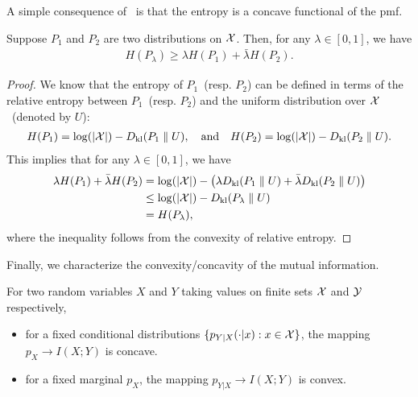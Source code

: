             A simple consequence of~ is that the entropy is a concave functional of the pmf. 
            \begin{corollary}
                \label{corollary:concavity-entropy} 
                Suppose $P_1$ and $P_2$ are two distributions on $\mathcal{X}$. Then, for any $\lambda \in [0, 1]$, we have 
                \begin{align}
                    H(P_\lambda) \geq \lambda H(P_1) + \bar{\lambda} H(P_2). 
                \end{align}
            \end{corollary}

            \begin{proof}
                We know that the entropy of $P_1$~(resp. $P_2$) can be defined in terms of the relative entropy between $P_1$~(resp. $P_2$) and the uniform distribution over $\mathcal{X}$~(denoted by $U$): 
                \begin{align}
                    H(P_1) = \log(|\mathcal{X}|) - D_{\text{kl}}(P_1 \parallel U), \quad \text{and} \quad   
                    H(P_2) = \log(|\mathcal{X}|) - D_{\text{kl}}(P_2 \parallel U). 
                \end{align}
                This implies that for any $\lambda \in [0,1]$, we have 
                \begin{align}
                    \lambda H(P_1) + \bar{\lambda}H(P_2) &= \log(|\mathcal{X}|) - \left( \lambda D_{\text{kl}}(P_1 \parallel U) + \bar{\lambda} D_{\text{kl}}(P_2 \parallel U) \right)  \\
                    & \leq \log(|\mathcal{X}|) - D_{\text{kl}}(P_\lambda \parallel U) \\ 
                    & = H(P_\lambda), 
                \end{align}
                where the inequality follows from the convexity of relative entropy.     
            \end{proof}

            Finally, we characterize the convexity/concavity of the mutual information. 
            \begin{theorem}
                \label{thm:convexity-mi}
                For two random variables $X$ and $Y$ taking values on finite sets $\mathcal{X}$ and $\mathcal{Y}$ respectively, 
                \begin{itemize}
                    \item for a fixed conditional distributions $\{p_{Y|X}(\cdot|x): x \in \mathcal{X}\}$, the mapping $p_X \to I(X; Y)$ is concave. 
                    \item for a fixed marginal $p_X$, the mapping $p_{Y|X} \to I(X; Y)$ is convex. 
                \end{itemize}
            \end{theorem}                

